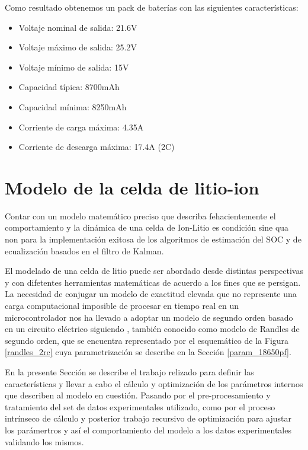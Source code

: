 \documentclass[10pt, a4paper]{report}
\begin{document}
Como resultado obtenemos un pack de bater\'ias con las siguientes
caracter\'isticas:

\begin{itemize}
    \item Voltaje nominal de salida: 21.6V
    \item Voltaje m\'aximo de salida: 25.2V
    \item Voltaje m\'inimo de salida: 15V
    \item Capacidad t\'ipica: 8700mAh
    \item Capacidad m\'inima: 8250mAh
    \item Corriente de carga m\'axima: 4.35A
    \item Corriente de descarga m\'axima: 17.4A (2C)
\end{itemize}

\section{Modelo de la celda de litio-ion}\label{dev_batt_model}

Contar con un modelo matemático preciso que describa fehacientemente el
comportamiento y la dinámica de una celda de Ion-Litio es condición sine qua non
para la implementación exitosa de los algoritmos de estimación del
\acrshort{SOC} y de ecualización basados en el filtro de Kalman.

El modelado de una celda de litio puede ser abordado desde distintas
perspectivas y con difetentes herramientas matemáticas de acuerdo a los fines
que se persigan. La necesidad de conjugar un modelo de exactitud elevada que no
represente una carga computacional imposible de procesar en tiempo real en un
microcontrolador nos ha llevado a adoptar un modelo de segundo orden basado en
un circuito eléctrico siguiendo \cite{spagnol_kalman}, también conocido como
modelo de Randles de segundo orden, que se encuentra representado por el
esquem\'atico de la Figura \ref{randles_2rc} cuya parametrizaci\'on se describe
en la Secci\'on \ref{param_18650pf}.

En la presente Sección se describe el trabajo relizado para definir las
características y llevar a cabo el cálculo y optimización de los parámetros
internos que describen al modelo en cuestión. Pasando por el pre-procesamiento y
tratamiento del set de datos experimentales utilizado, como por el proceso
intrínseco de cálculo y posterior trabajo recursivo de optimización para ajustar
los parámertros y así el comportamiento del modelo a los datos experimentales
validando los mismos.
\end{document}
